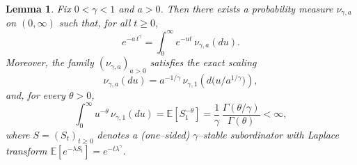 \documentclass[preprint]{imsart}
\newcommand{\1}{\mathbf{1}}
\theoremstyle{plain}
\newtheorem{lemma}[theorem]{Lemma}
\theoremstyle{definition}
\begin{document}
\begin{lemma}\label{lem:stable-rep-EN-eps}
Fix $0<\gamma< 1$ and $a>0$. Then there exists a \emph{probability} measure $\nu_{\gamma,a}$ on $(0,\infty)$ such that, for all $t\ge 0$,
\begin{equation}\label{eq:bernstein-EN-eps}
e^{-a\,t^{\gamma}}=\int_{0}^{\infty} e^{-u t}\,\nu_{\gamma,a}(du).
\end{equation}
Moreover, the family $(\nu_{\gamma,a})_{a>0}$ satisfies the exact scaling
\begin{equation}\label{eq:scale-EN-eps}
\nu_{\gamma,a}(du)=a^{-1/\gamma}\,\nu_{\gamma,1}\!\left(d\big(u/a^{1/\gamma}\big)\right),
\end{equation}
and, for every $\theta>0$,
\begin{equation}\label{eq:neg-moment-EN-eps}
\int_{0}^{\infty} u^{-\theta}\,\nu_{\gamma,1}(du)
=\mathbb{E}\!\left[S_1^{-\theta}\right]
=\frac{1}{\gamma}\,\frac{\Gamma(\theta/\gamma)}{\Gamma(\theta)}<\infty,
\end{equation}
where $S=(S_t)_{t\ge0}$ denotes a (one–sided) $\gamma$–stable subordinator with Laplace transform $\mathbb{E}[e^{-\lambda S_t}]=e^{-t\lambda^\gamma}$.
\end{lemma}
\end{document}
